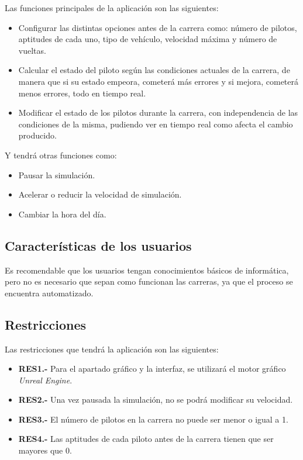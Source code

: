 Las funciones principales de la aplicación son las siguientes:

\begin{itemize}
    \item 
    Configurar las distintas opciones antes de la carrera como: número de pilotos, aptitudes de cada uno, tipo de vehículo, velocidad máxima y número de vueltas. 
    
    \item Calcular el estado del piloto según las condiciones actuales de la carrera, de manera que si su estado empeora, cometerá más errores y si mejora, cometerá menos errores, todo en tiempo real.
    
    \item Modificar el estado de los pilotos durante la carrera, con independencia de las condiciones de la misma, pudiendo ver en tiempo real como afecta el cambio producido.
\end{itemize}

Y tendrá otras funciones como:

\begin{itemize}
    \item Pausar la simulación.
    \item Acelerar o reducir la velocidad de simulación.
    \item Cambiar la hora del día.
\end{itemize}

\subsection{Características de los usuarios}

Es recomendable que los usuarios tengan conocimientos básicos de informática, pero no es necesario que sepan como funcionan las carreras, ya que el proceso se encuentra automatizado. 

\subsection{Restricciones}

Las restricciones que tendrá la aplicación son las siguientes:

\begin{itemize}
    \item \textbf{RES1.-} Para el apartado gráfico y la interfaz, se utilizará el motor gráfico \textit{Unreal Engine}.
    \item \textbf{RES2.-} Una vez pausada la simulación, no se podrá modificar su velocidad.
    \item \textbf{RES3.-} El número de pilotos en la carrera no puede ser menor o igual a 1.
    \item \textbf{RES4.-} Las aptitudes de cada piloto antes de la carrera tienen que ser mayores que 0.
\end{itemize}

